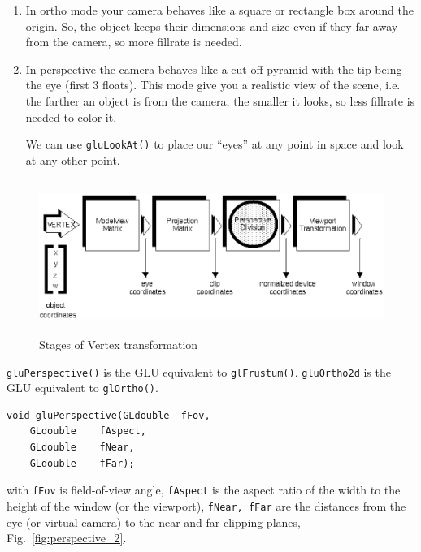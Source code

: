 \begin{enumerate}
\item In ortho mode your camera behaves like a square or rectangle box
  around the origin. So, the object keeps their dimensions and size
  even if they far away from the camera, so more fillrate is needed.

\item In perspective the camera behaves like a cut-off pyramid with
  the tip being the eye (first 3 floats). This mode give you a
  realistic view of the scene, i.e. the farther an object is from the
  camera, the smaller it looks, so less fillrate is needed to color
  it.

  We can use \verb!gluLookAt()! to place our ``eyes'' at any point in
  space and look at any other point.
\end{enumerate}

\begin{figure}[hbt]
  \centerline{\includegraphics[height=5cm,
    angle=0]{./images/camera_view.eps}}
  \caption{Stages of Vertex transformation}
  \label{fig:camera_view}
\end{figure}


\begin{framed}
  \verb!gluPerspective()! is the GLU equivalent to
  \verb!glFrustum()!. \verb!gluOrtho2d! is the GLU equivalent to
  \verb!glOrtho()!.
\end{framed}

\begin{verbatim}
void gluPerspective(GLdouble  fFov, 
 	GLdouble  	fAspect, 
 	GLdouble  	fNear, 
 	GLdouble  	fFar);
\end{verbatim}
with \verb!fFov! is field-of-view angle, \verb!fAspect! is the aspect
ratio of the width to the height of the window (or the viewport),
\verb!fNear, fFar! are the distances from the eye (or virtual camera)
to the near and far clipping planes, Fig.~\ref{fig:perspective_2}.

